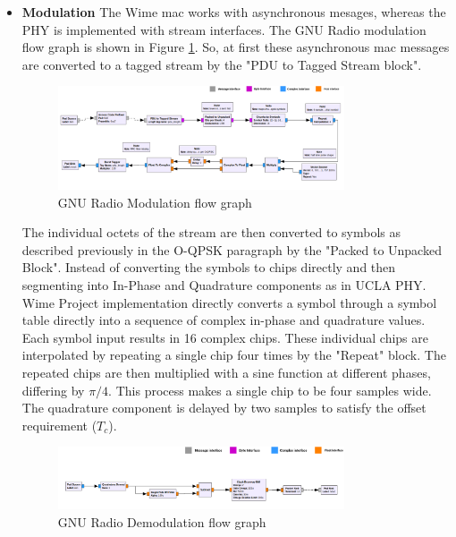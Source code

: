 \begin{itemize}

\item{\textbf{Modulation} The Wime \ac{mac} works with asynchronous mesages, whereas the \ac{PHY} is implemented with stream interfaces.
The GNU Radio modulation flow graph is shown in Figure \ref{TX flow graph}.
So, at first these asynchronous \ac{mac} messages are converted to a tagged stream by the "PDU to Tagged Stream block".
\begin{figure}[h!]
\centering
\includegraphics[width=0.8\textwidth]{Figure/TXPath.png}
\caption{GNU Radio Modulation flow graph}
\label{TX flow graph}
\end{figure}

The individual octets of the stream are then converted to symbols as described previously in the \ac{O-QPSK} paragraph by the "Packed to Unpacked Block".
Instead of converting the symbols to chips directly and then segmenting into In-Phase and Quadrature components as in UCLA PHY.
Wime Project implementation directly converts a symbol through a symbol table directly into a sequence of complex in-phase and quadrature values.
Each symbol input results in 16 complex chips.
These individual chips are interpolated by repeating a single chip four times by the "Repeat" block.
The repeated chips are then multiplied with a sine function at different phases, differing by $\pi/4$.
This process makes a single chip to be four samples wide.
The quadrature component is delayed by two samples to satisfy the offset requirement ($T_c$).}

\begin{figure}[h!]
\centering
\includegraphics[width=0.8\textwidth]{Figure/RXPath.png}
\caption{GNU Radio Demodulation flow graph}
\label{RX flow graph}
\end{figure}



\end{itemize}
